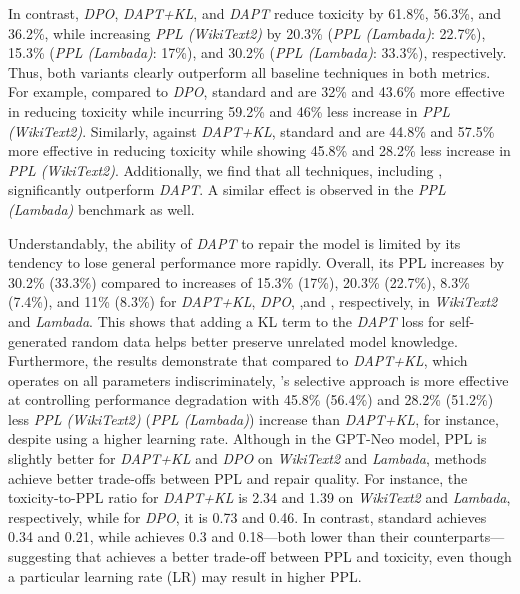 In contrast, \textit{DPO}, \textit{DAPT+KL}, and \textit{DAPT} reduce toxicity by 61.8\%, 56.3\%, and 36.2\%, while increasing \textit{PPL (WikiText2)} by 20.3\% (\textit{PPL (Lambada)}: 22.7\%), 15.3\% (\textit{PPL (Lambada)}: 17\%), and 30.2\% (\textit{PPL (Lambada)}: 33.3\%), respectively. Thus, both \nick variants clearly outperform all baseline techniques in both metrics. For example, compared to \textit{DPO}, standard \nick and \nickkl are 32\% and 43.6\% more effective in reducing toxicity while incurring 59.2\% and 46\% less increase in \textit{PPL (WikiText2)}. Similarly, against \textit{DAPT+KL}, standard \nick and \nickkl are 44.8\% and 57.5\% more effective in reducing toxicity while showing 45.8\% and 28.2\% less increase in \textit{PPL (WikiText2)}. Additionally, we find that all techniques, including \nick, significantly outperform \textit{DAPT}. A similar effect is observed in the \textit{PPL (Lambada)} benchmark as well.


Understandably, the ability of \textit{DAPT} to repair the model is limited by its tendency to lose general performance more rapidly. Overall, its PPL increases by 30.2\% (33.3\%) compared to increases of 15.3\% (17\%), 20.3\% (22.7\%), 8.3\% (7.4\%), and 11\% (8.3\%) for \textit{DAPT+KL}, \textit{DPO}, \nick,and \nickkl, respectively, in \textit{WikiText2} and \textit{Lambada}. This shows that adding a KL term to the \textit{DAPT} loss for self-generated random data helps better preserve unrelated model knowledge. Furthermore, the results demonstrate that compared to \textit{DAPT+KL}, which operates on all parameters indiscriminately, \nick's selective approach is more effective at controlling performance degradation with 45.8\% (56.4\%) and 28.2\% (51.2\%) less \textit{PPL (WikiText2)} (\textit{PPL (Lambada)}) increase than \textit{DAPT+KL}, for instance, despite using a higher learning rate. Although in the GPT-Neo model, PPL is slightly better for \textit{DAPT+KL} and \textit{DPO} on \textit{WikiText2} and \textit{Lambada}, \nick methods achieve better trade-offs between PPL and repair quality. For instance, the toxicity-to-PPL ratio for \textit{DAPT+KL} is 2.34 and 1.39 on \textit{WikiText2} and \textit{Lambada}, respectively, while for \textit{DPO}, it is 0.73 and 0.46. In contrast, standard \nick achieves 0.34 and 0.21, while \nickkl achieves 0.3 and 0.18—both lower than their counterparts—suggesting that \nick achieves a better trade-off between PPL and toxicity, even though a particular learning rate (LR) may result in higher PPL.

